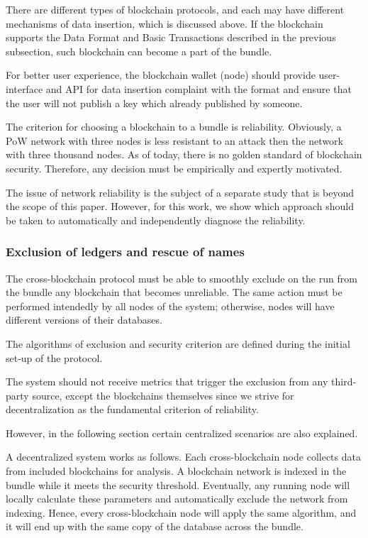 \begin{multicols}{2}
There are different types of blockchain protocols, and each may have different mechanisms of data insertion, which is discussed above. If the blockchain supports the Data Format and Basic Transactions described in the previous subsection, such blockchain can become a part of the bundle.

For better user experience, the blockchain wallet (node) should provide user-interface and API for data insertion complaint with the format and ensure that the user will not publish a key which already published by someone.

The criterion for choosing a blockchain to a bundle is reliability. Obviously, a PoW network with three nodes is less resistant to an attack then the network with three thousand nodes. As of today, there is no golden standard of blockchain security. Therefore, any decision must be empirically and expertly motivated.

The issue of network reliability is the subject of a separate study that is beyond the scope of this paper. However, for this work, we show which approach should be taken to automatically and independently diagnose the reliability.

\subsubsection{Exclusion of ledgers and rescue of names}\label{subsubsec-4.2.3}

The cross-blockchain protocol must be able to smoothly exclude on the run from the bundle any blockchain that becomes unreliable. The same action must be performed intendedly by all nodes of the system; otherwise, nodes will have different versions of their databases. 

The algorithms of exclusion and security criterion are defined during the initial set-up of the protocol.

The system should not receive metrics that trigger the exclusion from any third-party source, except the blockchains themselves since we strive for decentralization as the fundamental criterion of reliability.

However, in the following section certain centralized scenarios are also explained. 

A decentralized system works as follows. Each cross-blockchain node collects data from included blockchains for analysis. A blockchain network is indexed in the bundle while it meets the security threshold. Eventually, any running node will locally calculate these parameters and automatically exclude the network from indexing. Hence, every cross-blockchain node will apply the same algorithm, and it will end up with the same copy of the database across the bundle.


\end{multicols}

